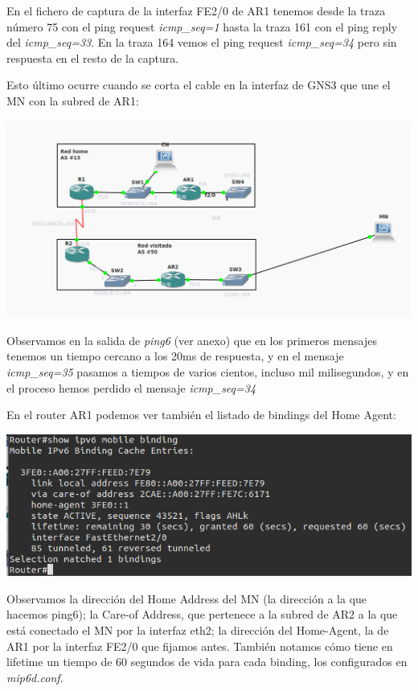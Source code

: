 \documentclass{article}
\begin{document}
En el fichero de captura de la interfaz FE2/0 de AR1 tenemos desde la traza número 75 con el ping request \textit{icmp\_seq=1} hasta la traza 161 con el ping reply del \textit{icmp\_seq=33}. En la traza 164 vemos el ping request \textit{icmp\_seq=34} pero sin respuesta en el resto de la captura.

Esto último ocurre cuando se corta el cable en la interfaz de GNS3 que une el MN con la subred de AR1:

\begin{center} 
	\includegraphics[scale=0.4]{images/topdesc.png}
\end{center}

Observamos en la salida de \textit{ping6} (ver anexo) que en los primeros mensajes tenemos un tiempo cercano a los 20ms de respuesta, y en el mensaje \textit{icmp\_seq=35} pasamos a tiempos de varios cientos, incluso mil milisegundos, y en el proceso hemos perdido el mensaje \textit{icmp\_seq=34}

En el router AR1 podemos ver también el listado de bindings del Home Agent:

\begin{center} 
	\includegraphics[scale=0.6]{images/ar1binding.png}
\end{center}

Observamos la dirección del Home Address del MN (la dirección a la que hacemos ping6); la Care-of Address, que pertenece a la subred de AR2 a la que está conectado el MN por la interfaz eth2; la dirección del Home-Agent, la de AR1 por la interfaz FE2/0 que fijamos antes. También notamos cómo tiene en lifetime un tiempo de 60 segundos de vida para cada binding, los configurados en \textit{mip6d.conf}.
\end{document}
